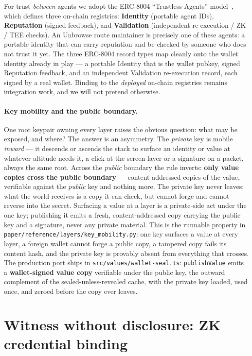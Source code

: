 \documentclass[11pt]{article}
\begin{document}
For trust \emph{between} agents we adopt the ERC-8004 ``Trustless Agents''
model~\cite{erc8004}, which defines three on-chain registries: \textbf{Identity}
(portable agent IDs), \textbf{Reputation} (signed feedback), and
\textbf{Validation} (independent re-execution / ZK / TEE checks). An Unbrowse route
maintainer is precisely one of these agents: a portable identity that can carry
reputation and be checked by someone who does not trust it yet. The three ERC-8004
record types map cleanly onto the wallet identity already in play --- a portable
Identity that is the wallet pubkey, signed Reputation feedback, and an independent
Validation re-execution record, each signed by a real wallet.
Binding to the \emph{deployed} on-chain registries remains integration work, and we
will not pretend otherwise.

\paragraph{Key mobility and the public boundary.} One root keypair owning every
layer raises the obvious question: what may be exposed, and where? The answer is an
asymmetry. The \emph{private} key is mobile \emph{inward} --- it descends or ascends
the stack to surface an identity or value at whatever altitude needs it, a click at
the screen layer or a signature on a packet, always the same root. Across the
\emph{public} boundary the rule inverts:
\textbf{only value copies cross the public boundary} --- content-addressed copies
of the value, verifiable against the
\emph{public} key and nothing more. The private key never leaves; what the world
receives is a copy it can check, but cannot forge and cannot reverse into the
secret. Surfacing a value at a layer is a private-side act under the one key;
publishing it emits a fresh, content-addressed copy carrying the public key and a
signature, never any private material. This is the runnable property in
\texttt{paper/reference/layers/key\_mobility.py}: one key surfaces a value at every
layer, a foreign wallet cannot forge a public copy, a tampered copy fails its
content hash, and the private key is provably absent from everything that crosses.
The production port ships in \texttt{src/values/wallet-seal.ts}: \texttt{publishValue}
emits a \textbf{wallet-signed value copy} verifiable under the public key, the
outward complement of the sealed-unless-revealed cache, with the private key loaded,
used once, and zeroed before the copy ever leaves.

\section{Witness without disclosure: ZK credential binding}
\end{document}
